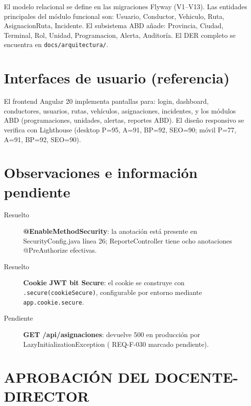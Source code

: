 \documentclass[12pt,a4paper]{article}
\begin{document}
El modelo relacional se define en las migraciones Flyway (V1--V13). Las entidades principales del módulo funcional son: Usuario, Conductor, Vehiculo, Ruta, AsignacionRuta, Incidente. El subsistema ABD añade: Provincia, Ciudad, Terminal, Rol, Unidad, Programacion, Alerta, Auditoría. El DER completo se encuentra en \texttt{docs/arquitectura/}.

\clearpage

\section{Interfaces de usuario (referencia)}
\label{sec:interfaces}

El frontend Angular 20 implementa pantallas para: login, dashboard, conductores, usuarios, rutas, vehículos, asignaciones, incidentes, y los módulos ABD (programaciones, unidades, alertas, reportes ABD). El diseño responsivo se verifica con Lighthouse (desktop P=95, A=91, BP=92, SEO=90; móvil P=77, A=91, BP=92, SEO=90).

\clearpage

\section{Observaciones e información pendiente}
\label{sec:observaciones}

\begin{description}
  \item[Resuelto] \textbf{@EnableMethodSecurity}: la anotación está presente en SecurityConfig.java línea 26; ReporteController tiene ocho anotaciones @PreAuthorize efectivas.
  \item[Resuelto] \textbf{Cookie JWT bit Secure}: el cookie se construye con \texttt{.secure(cookieSecure)}, configurable por entorno mediante \texttt{app.cookie.secure}.
  \item[Pendiente] \textbf{GET /api/asignaciones}: devuelve 500 en producción por LazyInitializationException ( REQ-F-030 marcado pendiente).
\end{description}

\clearpage

\section*{APROBACIÓN DEL DOCENTE-DIRECTOR}
\end{document}
